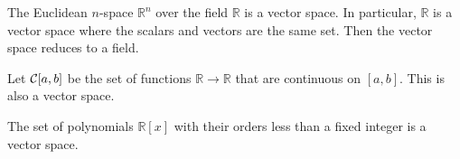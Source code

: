 

\begin{exm}
  The Euclidean $n$-space $\mathbb{R}^n$
   over the field $\mathbb{R}$
   is a vector space.
  In particular, $\mathbb{R}$ is a vector space
   where the scalars and vectors are the same set.
  Then the vector space reduces to a field.
\end{exm}

\begin{exm}
  Let ${\cal C}[a,b]$ be the set of functions
  $\mathbb{R}\rightarrow \mathbb{R}$
   that are continuous on $[a,b]$.
  This is also a vector space.
\end{exm}


\begin{exm}
  \label{exm:polynomialsFormVectorSpace}
  The set of polynomials ${\mathbb R}[x]$
   with their orders less than a fixed integer
   is a vector space.
\end{exm}


